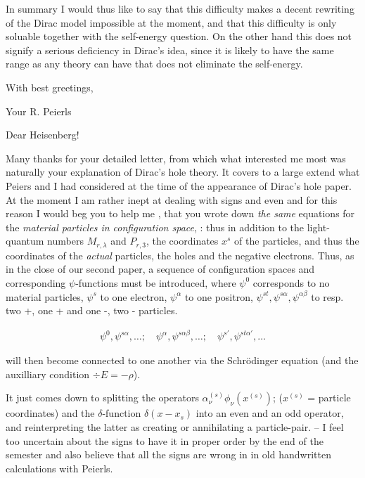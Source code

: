 \documentclass{article}
\newcommand{\uequ}[1]{
\begin{align*}
#1
\end{align*}
}
\begin{document}
In summary I would thus like to say that this difficulty makes a decent rewriting of the Dirac model impossible at the moment, and that this difficulty is only soluable together with the self-energy question. On the other hand this does not signify a serious deficiency in Dirac's idea, since it is likely to have the same range as any theory can have that does not eliminate the self-energy.

With best greetings,

Your R. Peierls

\date{July19, 1933}

Dear Heisenberg!

Many thanks for your detailed letter, from which what interested me most was naturally your explanation of Dirac's hole theory. It covers to a large extend what Peiers and I had considered at the time of the appearance of Dirac's hole paper. At the moment I am rather inept at dealing with signs and even  and for this reason I would beg you to help me , that you wrote down \textit{the same} equations for the \textit{material particles in configuration space}, : thus in addition to the light-quantum numbers $M_{r,\lambda}$ and $P_{r,3}$, the coordinates $x^s$ of the particles, and thus the coordinates of the \textit{actual} particles, the holes and the negative electrons. Thus, as in the close of our second paper, a sequence of configuration spaces and corresponding $\psi$-functions must be introduced, where $\psi^0$ corresponds to no material particles, $\psi^s$ to one electron, $\psi^\alpha$ to one positron, $\psi^{st},\psi^{s\alpha}, \psi^{\alpha\beta}$ to resp. two +, one + and one -, two - particles.
\uequ{
\psi^0,\psi^{s\alpha},\dots;\quad
\psi^\alpha,\psi^{s\alpha\beta},\dots;\quad
\psi^{s'}, \psi^{st\alpha'}, \dots
}
will then become connected to one another via the Schr\"odinger equation (and the auxilliary condition $\div E = -\rho$).

It just comes down to splitting the operators $\alpha^{(s)}_\nu \phi_\nu (x^{(s)})$; ($x^{(s)}$ = particle coordinates) and the $\delta$-function $\delta(x-x_s)$ into an even and an odd operator, and reinterpreting the latter as creating or annihilating a particle-pair. -- I feel too uncertain about the signs to have it in proper order by the end of the semester and also believe that all the signs are wrong in in old handwritten calculations with Peierls.
\end{document}
